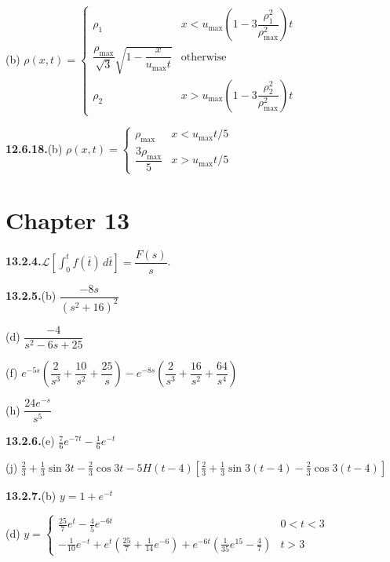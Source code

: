 \quad (b) $\rho(x,t) = \begin{cases} \rho_1 & x < u_{\max}\left(1-3\dfrac{\rho_1^2}{\rho_{\max}^2}\right)t \\ \dfrac{\rho_{\max}}{\sqrt{3}}\sqrt{1-\dfrac{x}{u_{\max}t}} & \text{otherwise} \\ \rho_2 & x > u_{\max}\left(1-3\dfrac{\rho_2^2}{\rho_{\max}^2}\right)t \end{cases}$%

\medskip
\textbf{12.6.18.}\quad (b) $\rho(x,t) = \begin{cases} \rho_{\max} & x < u_{\max}t/5 \\ \dfrac{3\rho_{\max}}{5} & x > u_{\max}t/5 \end{cases}$%

\section*{Chapter 13}

\textbf{13.2.4.}\quad $\mathcal{L}\left[\int_0^t f(\bar{t})\,d\bar{t}\right] = \dfrac{F(s)}{s}$.

\medskip
\textbf{13.2.5.}\quad (b) $\dfrac{-8s}{(s^2+16)^2}$

\quad (d) $\dfrac{-4}{s^2-6s+25}$

\quad (f) $e^{-5s}\left(\dfrac{2}{s^3}+\dfrac{10}{s^2}+\dfrac{25}{s}\right)-e^{-8s}\left(\dfrac{2}{s^3}+\dfrac{16}{s^2}+\dfrac{64}{s^4}\right)$%

\quad (h) $\dfrac{24e^{-s}}{s^5}$

\medskip
\textbf{13.2.6.}\quad (e) $\frac{7}{6}e^{-7t}-\frac{1}{6}e^{-t}$

\quad (j) $\frac{2}{3}+\frac{1}{3}\sin 3t - \frac{2}{3}\cos 3t - 5H(t-4)\left[\frac{2}{3}+\frac{1}{3}\sin 3(t-4)-\frac{2}{3}\cos 3(t-4)\right]$

\medskip
\textbf{13.2.7.}\quad (b) $y = 1 + e^{-t}$

\quad (d) $y = \begin{cases} \frac{25}{7}e^t - \frac{4}{5}e^{-6t} & 0 < t < 3 \\[4pt] -\frac{1}{10}e^{-t}+e^t\left(\frac{25}{7}+\frac{1}{14}e^{-6}\right)+e^{-6t}\left(\frac{1}{35}e^{15}-\frac{4}{7}\right) & t > 3 \end{cases}$%

